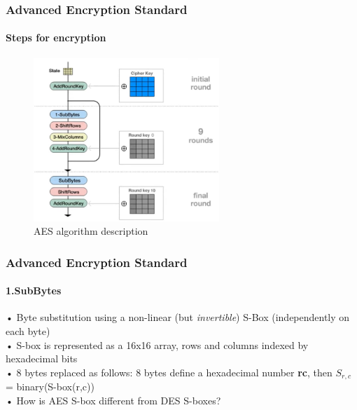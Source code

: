 \begin{frame}
	\frametitle{Advanced Encryption Standard}
		\framesubtitle{Steps for encryption}
	\vspace{-0.2cm}
	\begin{figure}
		\centering
		\includegraphics[width=7cm]{encryption}
		\caption{AES algorithm description}
		\label{fig:obrazek encryption}
	\end{figure}
\end{frame}

\begin{frame}
	\frametitle{Advanced Encryption Standard}
		\framesubtitle{1.SubBytes}
	{\normalsize 	
	{• Byte substitution using a non-linear (but \textit{invertible}) S-Box (independently on each byte)}\\
	{• S-box is represented as a 16x16 array, rows and columns indexed by hexadecimal bits}\\
    {• 8 bytes replaced as follows: 8 bytes define a hexadecimal number \textbf{rc}, then $S_{r,c}$ = binary(S-box(r,c))}\\
    \vspace{0.4cm}
    {• How is AES S-box different from DES S-boxes?}\\
	\\
	\hspace{0.5cm}{- S-boxes based on modular arithmetic with polynomials, can be}\\
	\hspace{0.4cm}{defined algebraically}\\
	\hspace{0.5cm}{- Easy to analyze, prove attacks fail}\\
	}
\end{frame}

